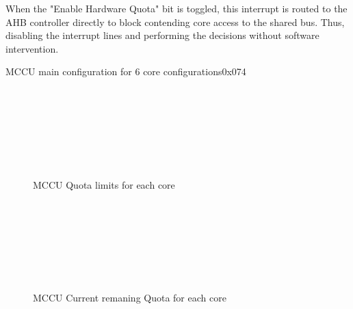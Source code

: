 When the "Enable Hardware Quota" bit is toggled, this interrupt is routed to the AHB controller directly to block contending core access to the shared bus. Thus, disabling the interrupt lines and performing the decisions without software intervention.


\begin{register}{}{MCCU main configuration for 6 core configurations}{0x074}
	\label{MCCU_cfg_6c}
	\regnewline
\end{register}
\begin{figure}[H]
	\begin{center}
		 \\
		 \\
		 \\
		 \\
		 \\
		 \\
	\end{center}
	\caption{MCCU Quota limits for each core}\label{fig:MCCU_lim}
\end{figure}
\begin{figure}[H]
	\begin{center}
		 \\
		 \\
		 \\
		 \\
		 \\
		 \\
	\end{center}
	\caption{MCCU Current remaning Quota for each core}\label{fig:MCCU_ava}
\end{figure}
